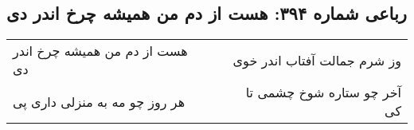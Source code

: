 \begin{center}
\section*{رباعی شماره ۳۹۴: هست از دم من همیشه چرخ اندر دی}
\label{sec:sh394}
\begin{longtable}{l p{0.5cm} r}
هست از دم من همیشه چرخ اندر دی
&&
وز شرم جمالت آفتاب اندر خوی
\\
هر روز چو مه به منزلی داری پی
&&
آخر چو ستاره شوخ چشمی تا کی
\\
\end{longtable}
\end{center}
